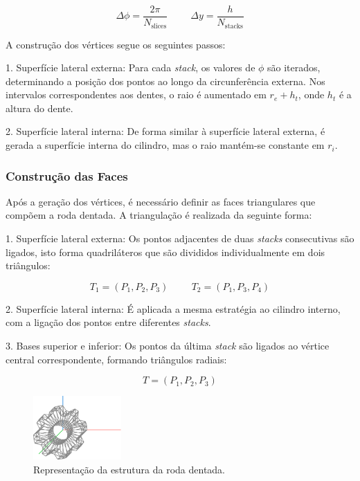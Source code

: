 \documentclass[12pt, a4paper]{article}
\begin{document}
$$
\Delta \phi = \frac{2\pi}{N_\text{slices}}
\hspace{1cm}
\Delta y = \frac{h}{N_\text{stacks}}
$$

A construção dos vértices segue os seguintes passos:

1. Superfície lateral externa: Para cada \emph{stack}, os valores de $\phi$ são iterados,
determinando a posição dos pontos ao longo da circunferência externa. Nos intervalos correspondentes
aos dentes, o raio é aumentado em $r_e + h_t$, onde $h_t$ é a altura do dente.

2. Superfície lateral interna: De forma similar à superfície lateral externa, é gerada a superfície
interna do cilindro, mas o raio mantém-se constante em $r_i$.

\subsubsection{Construção das Faces}

Após a geração dos vértices, é necessário definir as faces triangulares que compõem a roda dentada.
A triangulação é realizada da seguinte forma:

1. Superfície lateral externa: Os pontos adjacentes de duas \emph{stacks} consecutivas são
ligados, isto forma quadriláteros que são divididos individualmente em dois triângulos:

$$
T_1 = (P_1, P_2, P_3)
\hspace{1cm}
T_2 = (P_1, P_3, P_4)
$$

2. Superfície lateral interna: É aplicada a mesma estratégia ao cilindro interno, com a ligação
dos pontos entre diferentes \emph{stacks}.

3. Bases superior e inferior: Os pontos da última \emph{stack} são ligados ao vértice central
correspondente, formando triângulos radiais:

$$
T = (P_1, P_2, P_3)
$$

\begin{figure}[H]
    \centering
    \includegraphics[width=0.3\textwidth]{res/phase2/figures/gear.pdf}
    \caption{Representação da estrutura da roda dentada.}
\end{figure}
\end{document}

